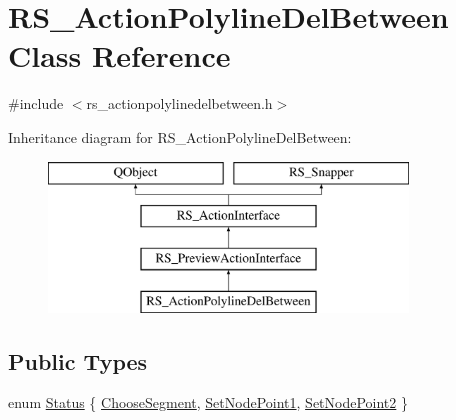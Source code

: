 \hypertarget{classRS__ActionPolylineDelBetween}{\section{R\-S\-\_\-\-Action\-Polyline\-Del\-Between Class Reference}
\label{classRS__ActionPolylineDelBetween}
}


{\ttfamily \#include $<$rs\-\_\-actionpolylinedelbetween.\-h$>$}

Inheritance diagram for R\-S\-\_\-\-Action\-Polyline\-Del\-Between\-:\begin{figure}[H]
\begin{center}
\leavevmode
\includegraphics[height=4.000000cm]{classRS__ActionPolylineDelBetween}
\end{center}
\end{figure}
\subsection*{Public Types}
\begin{DoxyCompactItemize}
\item 
enum \hyperlink{classRS__ActionPolylineDelBetween_ae1df6326a0a5a6c392e1918b769817ab}{Status} \{ \hyperlink{classRS__ActionPolylineDelBetween_ae1df6326a0a5a6c392e1918b769817abaf7931f44bde6aead7d4eefd4570305a7}{Choose\-Segment}, 
\hyperlink{classRS__ActionPolylineDelBetween_ae1df6326a0a5a6c392e1918b769817aba4c23b916998db87b13f628fa3b5536c4}{Set\-Node\-Point1}, 
\hyperlink{classRS__ActionPolylineDelBetween_ae1df6326a0a5a6c392e1918b769817ababa40b85b595a3162a73a0f101a697ea0}{Set\-Node\-Point2}
 \}
\end{DoxyCompactItemize}
